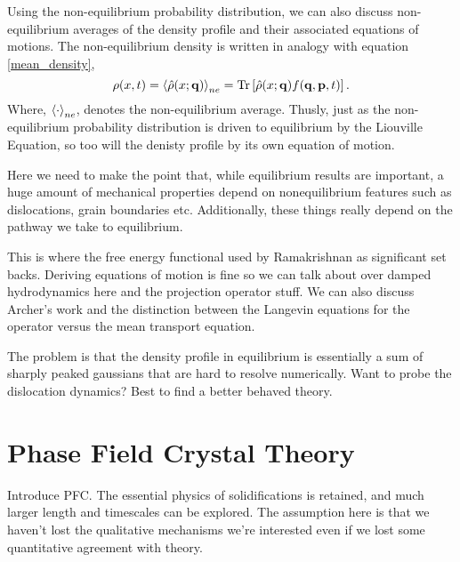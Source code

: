 Using the non-equilibrium probability distribution, we can also discuss non-equilibrium averages of the density profile and their associated equations of motions. The non-equilibrium density is written in analogy with equation \ref{mean_density},
%
\begin{equation}
    \rho(x, t) = \left\langle \hat{\rho}(x; \mathbf{q}) \right\rangle_{ne} =
        \mathrm{Tr}\left[ \hat{\rho}(x; \mathbf{q}) f(\mathbf{q}, \mathbf{p}, t) \right].
\end{equation}
%
Where, $\left\langle \cdot \right\rangle_{ne}$, denotes the non-equilibrium average. Thusly, just
as the non-equilibrium probability distribution is driven to equilibrium by the
Liouville Equation, so too will the denisty profile by its own equation of
motion.

{\color{ForestGreen} { \bfseries
    
    
    Here we need to make the point that, while equilibrium results are
    important, a huge amount of mechanical properties depend on
    nonequilibrium features such as dislocations, grain boundaries etc.
    Additionally, these things really depend on the pathway we take to
    equilibrium. 

    This is where the free energy functional used by Ramakrishnan as
    significant set backs. Deriving equations of motion is fine so we can
    talk about over damped hydrodynamics here and the projection operator
    stuff. We can also discuss Archer's work and the distinction between
    the Langevin equations for the operator versus the mean transport
    equation.

    The problem is that the density profile in equilibrium is essentially
    a sum of sharply peaked gaussians that are hard to resolve
    numerically. Want to probe the dislocation dynamics? Best to find a
    better behaved theory.} }

\section{Phase Field Crystal Theory} %

{\color{ForestGreen} {\bfseries


Introduce PFC. The essential physics of solidifications is retained,
and much larger length and timescales can be explored. The assumption
here is that we haven't lost the qualitative mechanisms we're
interested even if we lost some quantitative agreement with theory.} }
